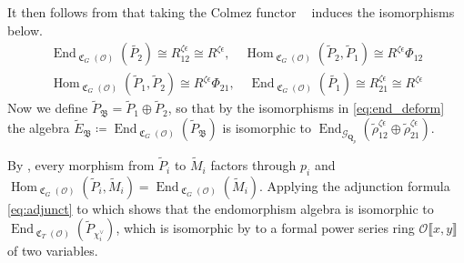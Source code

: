 \documentclass[leqno]{amsart}
\theoremstyle{definition}
\theoremstyle{remark}
\newcommand{\oo}{\mathcal{O}}
\newcommand{\Qp}{\mathbf{Q}_p}
\DeclareMathOperator{\End}{End}
\DeclareMathOperator{\Hom}{Hom}
\DeclareMathOperator{\fC}{\mathfrak{C}} %
\DeclareMathOperator{\V}{\check{\mathbf{V}}} %
\newcommand{\Gp}{\mathcal{G}_{\Qp}} %
\newcommand{\B}{\mathfrak B} %
\begin{document}
It then follows from \cite[Lem 8.10]{pask} that 
taking the Colmez functor 
$\V$ induces the isomorphisms below.
\begin{equation}\label{eq:end_deform}
\begin{split}
	\End_{\fC_{G}(\oo)}(\tilde{P_2})\cong 
    R^{\zeta\epsilon}_{12}\cong R^{\zeta\epsilon},\quad
	\Hom_{\fC_G(\oo)}(\tilde{P}_2, \tilde{P}_1)\cong
    R^{\zeta\epsilon}\Phi_{12}\\
	\Hom_{\fC_G(\oo)}(\tilde{P}_1, \tilde{P}_2)\cong
    R^{\zeta\epsilon}\Phi_{21},\quad
	\End_{\fC_{G}(\oo)}(\tilde{P_1})\cong 
    R^{\zeta\epsilon}_{21}\cong R^{\zeta\epsilon}
\end{split}
\end{equation}
Now we define $ \tilde{P}_\B=\tilde{P}_1\oplus \tilde{P}_2$,
so that by the isomorphisms in \eqref{eq:end_deform} the algebra
$\tilde{E}_\B\coloneqq
\End_{\fC_G(\oo)}(\tilde{P}_\B)$
is isomorphic to 
$\End_{\Gp}(\tilde{\rho}^{\zeta\epsilon}_{12}\oplus
\tilde{\rho}^{\zeta\epsilon}_{21})$.

By \cite[Prop 7.1]{pask},
every morphism from $\tilde{P}_i$ to $\tilde{M}_i$
factors through $p_i$ and
$\Hom_{\fC_G(\oo)}(\tilde{P}_i, \tilde{M}_i)=
\End_{\fC_G(\oo)}(\tilde{M}_i)$.
Applying the adjunction formula \eqref{eq:adjunct} to which 
shows that the endomorphism algebra is isomorphic to 
$\End_{\fC_T(\oo)}(\tilde{P}_{\chi_i^\vee})$,
which is isomorphic by \cite[Prop 3.34]{pask} to
a formal power series ring
$ \oo\llbracket x,y\rrbracket$
of two variables.
\end{document}
